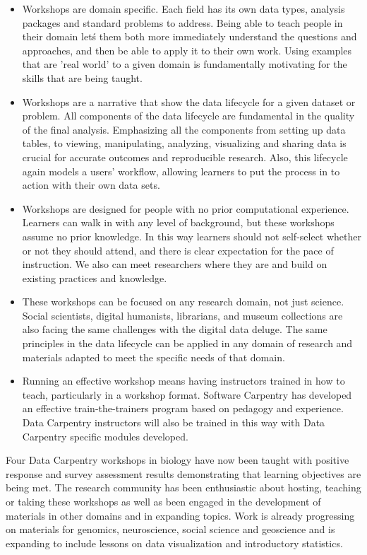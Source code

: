 \documentclass[15]{idcc}
\begin{document}
\begin{itemize}
\item Workshops are domain specific. Each field has its own data types, analysis packages and standard problems to address. Being able to teach people in their domain let\'s them both more immediately understand the questions and approaches, and then be able to apply it to their own work. Using examples that are 'real world' to a given domain is fundamentally motivating for the skills that are being taught.

\item Workshops are a narrative that show the data lifecycle for a given dataset or problem. All components of the data lifecycle are fundamental in the quality of the final analysis. Emphasizing all the components from setting up data tables, to viewing, manipulating, analyzing, visualizing and sharing data is crucial for accurate outcomes and reproducible research. Also, this lifecycle again models a users' workflow, allowing learners to put the process in to action with their own data sets.

\item Workshops are designed for people with no prior computational experience. Learners can walk in with any level of background, but these workshops assume no prior knowledge. In this way learners should not self-select whether or not they should attend, and there is clear expectation for the pace of instruction. We also can meet researchers where they are and build on existing practices and knowledge.

\item These workshops can be focused on any research domain, not just science. Social scientists, digital humanists, librarians, and museum collections are also facing the same challenges with the digital data deluge. The same principles in the data lifecycle can be applied in any domain of research and materials adapted to meet the specific needs of that domain.

\item Running an effective workshop means having instructors trained in how to teach, particularly in a workshop format. Software Carpentry has developed an effective train-the-trainers program based on pedagogy and experience. Data Carpentry instructors will also be trained in this way with Data Carpentry specific modules developed. 

\end{itemize}

Four Data Carpentry workshops in biology have now been taught with positive response and survey assessment results demonstrating that learning objectives are being met. The research community has been enthusiastic about hosting, teaching or taking these workshops as well as been engaged in the development of materials in other domains and in expanding topics. Work is already progressing on materials for genomics, neuroscience, social science and geoscience and is expanding to include lessons on data visualization and introductory statistics.
\end{document}
